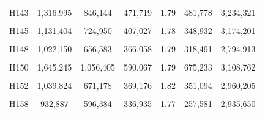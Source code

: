 \documentclass[
  a4paper,
  titlepage]{article}
\begin{document}
\begin{longtable}[t]{ccccccc}
H143 & 1,316,995 & 846,144 & 471,719 & 1.79 & 481,778 & 3,234,321\\
 
\cellcolor{gray!6}{H144} & \cellcolor{gray!6}{1,300,357} & \cellcolor{gray!6}{837,038} & \cellcolor{gray!6}{464,061} & \cellcolor{gray!6}{1.80} & \cellcolor{gray!6}{435,025} & \cellcolor{gray!6}{2,943,770}\\
 
H145 & 1,131,404 & 724,950 & 407,027 & 1.78 & 348,932 & 3,174,201\\
 
\cellcolor{gray!6}{H146} & \cellcolor{gray!6}{1,084,945} & \cellcolor{gray!6}{698,225} & \cellcolor{gray!6}{387,289} & \cellcolor{gray!6}{1.80} & \cellcolor{gray!6}{346,763} & \cellcolor{gray!6}{2,852,541}\\
 
H148 & 1,022,150 & 656,583 & 366,058 & 1.79 & 318,491 & 2,794,913\\
 
\cellcolor{gray!6}{H149} & \cellcolor{gray!6}{1,009,633} & \cellcolor{gray!6}{645,372} & \cellcolor{gray!6}{364,723} & \cellcolor{gray!6}{1.77} & \cellcolor{gray!6}{275,529} & \cellcolor{gray!6}{3,103,113}\\
 
H150 & 1,645,245 & 1,056,405 & 590,067 & 1.79 & 675,233 & 3,108,762\\
 
\cellcolor{gray!6}{H151} & \cellcolor{gray!6}{1,456,227} & \cellcolor{gray!6}{934,931} & \cellcolor{gray!6}{522,348} & \cellcolor{gray!6}{1.79} & \cellcolor{gray!6}{543,444} & \cellcolor{gray!6}{3,125,172}\\
 
H152 & 1,039,824 & 671,178 & 369,176 & 1.82 & 351,094 & 2,960,205\\
 
\cellcolor{gray!6}{H157} & \cellcolor{gray!6}{1,090,479} & \cellcolor{gray!6}{696,784} & \cellcolor{gray!6}{394,252} & \cellcolor{gray!6}{1.77} & \cellcolor{gray!6}{357,248} & \cellcolor{gray!6}{3,065,918}\\
 
H158 & 932,887 & 596,384 & 336,935 & 1.77 & 257,581 & 2,935,650\\
 
\cellcolor{gray!6}{H159} & \cellcolor{gray!6}{1,189,565} & \cellcolor{gray!6}{766,109} & \cellcolor{gray!6}{424,203} & \cellcolor{gray!6}{1.81} & \cellcolor{gray!6}{401,479} & \cellcolor{gray!6}{3,105,191}\\
 

\end{longtable}
\end{document}
